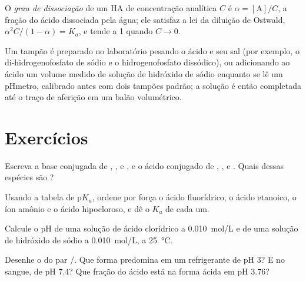 \begin{definition}\label{def:b1:predominant-reaction:dissociation}
O \emph{grau de dissociação} de um 
HA de concentração analítica $C$ é $\alpha = [\mathrm{A}]/C$, a fração do
ácido dissociada pela água; ele satisfaz a lei da diluição de Ostwald,
$\alpha^2C/(1 - \alpha) = K_a$, e tende a 1 quando $C \to 0$.
\end{definition}

\begin{inthelab}
Um tampão é preparado no laboratório pesando o ácido e seu sal (por
exemplo, o di-hidrogenofosfato de sódio e o hidrogenofosfato
dissódico), ou adicionando ao ácido um volume medido de solução de
hidróxido de sódio enquanto se lê um pHmetro, calibrado antes com dois
tampões padrão; a solução é então completada até o traço de aferição em
um balão volumétrico.
\end{inthelab}

\section{Exercícios}

\begin{exercise}[$\star$]\label{exo:b1:predominant-reaction:1}
Escreva a base conjugada de , ,  e
, e o ácido conjugado de , ,  e
. Quais dessas espécies são ?
\end{exercise}

\begin{exercise}[$\star$]\label{exo:b1:predominant-reaction:2}
Usando a tabela de $\mathrm{p}K_a$, ordene por força o ácido fluorídrico,
o ácido etanoico, o íon amônio e o ácido hipocloroso, e dê o $K_a$ de
cada um.
\end{exercise}

\begin{exercise}[$\star$]\label{exo:b1:predominant-reaction:3}
Calcule o pH de uma solução de ácido clorídrico a \qty{0.010}{mol/L} e
de uma solução de hidróxido de sódio a \qty{0.010}{mol/L}, a
\qty{25}{\celsius}.
\end{exercise}

\begin{exercise}[$\star$]\label{exo:b1:predominant-reaction:4}
Desenhe o  do par /.
Que forma predomina em um refrigerante de pH 3? E no sangue, de pH 7.4?
Que fração do ácido está na forma ácida em pH 3.76?
\end{exercise}

